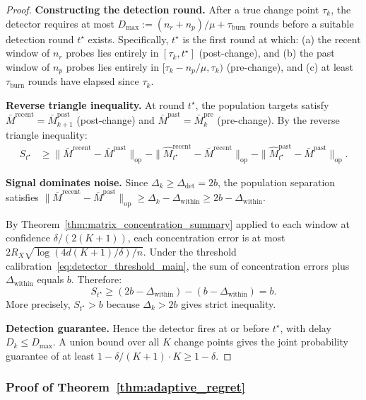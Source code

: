 \documentclass{article}
\newcommand{\op}{\mathrm{op}}
\begin{document}
\begin{proof}
\textbf{Constructing the detection round.}
After a true change point $\tau_k$, the detector requires at most $D_{\max} := (n_r + n_p)/\mu + \tau_{\mathrm{burn}}$ rounds before a suitable detection round $t^\star$ exists.  Specifically, $t^\star$ is the first round at which: (a) the recent window of $n_r$ probes lies entirely in $[\tau_k, t^\star]$ (post-change), and (b) the past window of $n_p$ probes lies entirely in $[\tau_k - n_p/\mu, \tau_k)$ (pre-change), and (c) at least $\tau_{\mathrm{burn}}$ rounds have elapsed since $\tau_k$.

\textbf{Reverse triangle inequality.}
At round $t^\star$, the population targets satisfy $\bar M^{\mathrm{recent}} = \bar M_{k+1}^{\mathrm{post}}$ (post-change) and $\bar M^{\mathrm{past}} = \bar M_k^{\mathrm{pre}}$ (pre-change).  By the reverse triangle inequality:
\begin{align*}
S_{t^\star}
&\ge \|\bar M^{\mathrm{recent}} - \bar M^{\mathrm{past}}\|_{\op}
    - \|\widehat M_{t^\star}^{\mathrm{recent}} - \bar M^{\mathrm{recent}}\|_{\op}
    - \|\widehat M_{t^\star}^{\mathrm{past}} - \bar M^{\mathrm{past}}\|_{\op}.
\end{align*}

\textbf{Signal dominates noise.}
Since $\Delta_k \ge \Delta_{\mathrm{det}} = 2b$, the population separation satisfies $\|\bar M^{\mathrm{recent}} - \bar M^{\mathrm{past}}\|_{\op} \ge \Delta_k - \Delta_{\mathrm{within}} \ge 2b - \Delta_{\mathrm{within}}$.

By Theorem~\ref{thm:matrix_concentration_summary} applied to each window at confidence $\delta/(2(K+1))$, each concentration error is at most $2R_X\sqrt{\log(4d(K+1)/\delta)/n}$.  Under the threshold calibration~\eqref{eq:detector_threshold_main}, the sum of concentration errors plus $\Delta_{\mathrm{within}}$ equals $b$.  Therefore:
\[
S_{t^\star} \ge (2b - \Delta_{\mathrm{within}}) - (b - \Delta_{\mathrm{within}}) = b.
\]
More precisely, $S_{t^\star} > b$ because $\Delta_k > 2b$ gives strict inequality.

\textbf{Detection guarantee.}
Hence the detector fires at or before $t^\star$, with delay $D_k \le D_{\max}$.  A union bound over all $K$ change points gives the joint probability guarantee of at least $1 - \delta/(K+1) \cdot K \ge 1 - \delta$.
\end{proof}

\subsubsection{Proof of Theorem~\ref{thm:adaptive_regret}}
\label{proof:adaptive_regret}
\end{document}
